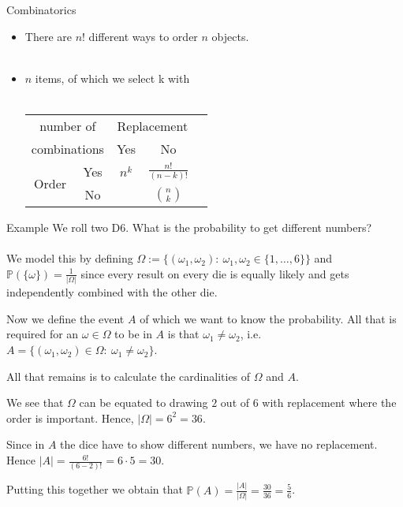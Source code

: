 \documentclass[11pt,pdf,ngerman,UKenglish]{beamer}%
\newcommand{\IP}{\mathbb{P}}
\newcommand{\1}{\mathbb{1}}
\theoremstyle{thm}
\theoremstyle{def}
\begin{document}
\begin{frame}{Combinatorics}
\begin{itemize}
\item There are $n!$ different ways to order $n$ objects.
\\ \ \\
\item $n$ items, of which we select k with
\\ \ \\
\begin{center}
{\renewcommand{\arraystretch}{1.5}
\begin{tabular}{|c|c|c|c|c|}
\hline
\multicolumn{2}{|c|}{ number of } & \multicolumn{2}{c|}{Replacement} \\ \cline{3-4}
\multicolumn{2}{|c|}{ combinations } & Yes & No \\ \hline
\multirow{2}{*}{Order} & Yes & $n^k$ & $\frac{n!}{(n-k)!}$ \\[1pt] \cline{2-4}
& No & \color{gray}{$ {n+k-1}\choose{n}$} & $n\choose {k}$ \\ \hline
\end{tabular}
}
\end{center}
\end{itemize}
\end{frame}


\begin{frame}{Example}
We roll two D6. What is the probability to get different numbers?
\\ \ \\
\pause
We model this by defining $\Omega:= \{ (\omega_1,\omega_2):\ \omega_1,\omega_2 \in \{1,\ldots,6\} \}$ and $\IP(\{\omega\})=\frac{1}{\vert \Omega \vert}$ since every result on every die is equally likely and gets independently combined with the other die.

\pause
Now we define the event $A$ of which we want to know the probability. All that is required for an $\omega \in \Omega$ to be in $A$ is that $\omega_1 \neq \omega_2$, i.e.\ $A= \{ (\omega_1,\omega_2) \in \Omega:\ \omega_1 \neq \omega_2 \}$. 

All that remains is to calculate the cardinalities of $\Omega$ and $A$.

\pause
We see that $\Omega$ can be equated to drawing $2$ out of $6$ with replacement where the order is important. Hence, $\vert \Omega \vert = 6^2 = 36$.

Since in $A$ the dice have to show different numbers, we have no replacement. Hence $\vert A \vert = \frac{6!}{(6-2)!}= 6 \cdot 5=30$. 

Putting this together we obtain that $\IP(A) = \frac{\vert A \vert}{\vert \Omega \vert} = \frac{30}{36}=\frac{5}{6}$.
\vfill
\end{frame}
\end{document}
